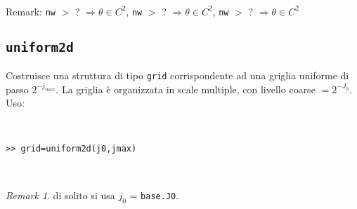 \documentclass{amsart}
\theoremstyle{definition}
\theoremstyle{remark}
\newtheorem{rem}[thm]{Remark}
\numberwithin{equation}{section}
\begin{document}
\

Remark: {\tt nw} $>$ ? $ \Rightarrow \theta \in C^2$,  {\tt nw} $>$ ?  $ \Rightarrow \theta \in C^2$,  {\tt nw} $>$ ? $ \Rightarrow \theta \in C^2$


\subsection*{\tt uniform2d} Costruisce una struttura di tipo {\tt grid} corrispondente ad una griglia uniforme di passo $2^{-j_{max}}$. La griglia \`e organizzata in scale multiple, con livello coarse $= 2^{-J_0}$. Uso:

\

{\tt >> grid=uniform2d(j0,jmax) }

\

\begin{rem} di solito si usa $j_0$ = {\tt base.J0}. \end{rem}
\end{document}
